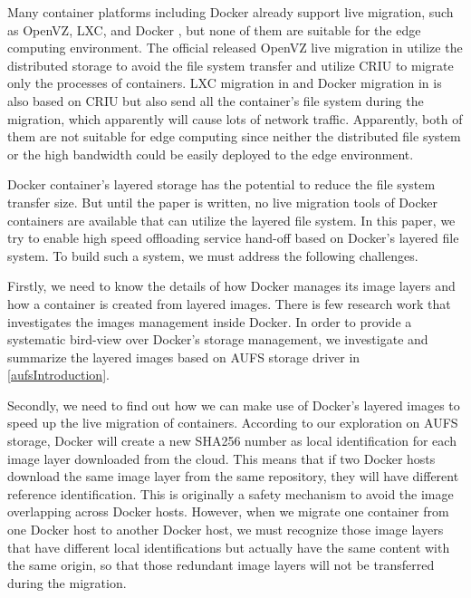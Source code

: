 Many container platforms including Docker already support live migration, such as OpenVZ\cite{openvz}, LXC\cite{qiu2016evaluating}, and Docker \cite{phaul,boucherPhaul}, but none of them are suitable for the edge computing environment. The official released OpenVZ live migration in \cite{phaul} utilize the distributed storage to avoid the file system transfer and utilize CRIU \cite{criu} to migrate only the processes of containers.
LXC migration in \cite{qiu2016evaluating} and Docker migration in \cite{phaul, boucherPhaul} is also based on CRIU but also send all the container's file system during the migration, which apparently will cause lots of network traffic. Apparently, both of them are not suitable for edge computing since neither the distributed file system or the high bandwidth could be easily deployed to the edge environment.

Docker container's layered storage has the potential to reduce the file system transfer size. But until the paper is written, no live migration tools of Docker containers are available that can utilize the layered file system. 
In this paper, we try to enable high speed offloading service hand-off based on Docker's layered file system. To build such a system, we must address the following challenges.

Firstly, we need to know the details of how Docker manages its image layers and how a container is created from layered images. There is few research work that investigates the images management inside Docker. In order to provide a systematic bird-view over Docker's storage management, we investigate and summarize the layered images based on AUFS storage driver in \ref{aufsIntroduction}.

Secondly, we need to find out how we can make use of Docker's layered images to speed up the live migration of containers. According to our exploration on AUFS storage, Docker will create a new SHA256 number as local  identification for each image layer downloaded from the cloud. 
This means that if two Docker hosts download the same image layer from the same repository, they will have different reference identification. This is originally a safety mechanism to avoid the image overlapping across Docker hosts\cite{dockerlayer}. 
However, when we migrate one container from one Docker host to another Docker host, we must recognize those image layers that have different local identifications but actually have the same content with the same origin, so that those redundant image layers will not be transferred during the migration.

